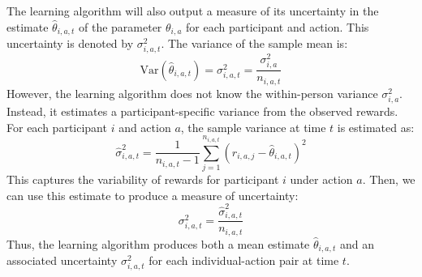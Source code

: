 \documentclass[letterpaper, 9pt]{extarticle}
\newcommand{\sam}[1]{
  {\color{blue} [SAM: {#1}]}
 }
\newcommand{\nys}[1]{%
  {\color{nyscolor} [\textbf{NYS}: {#1}]}%
}
\newcommand{\btk}[1]{%
  {\color{red} [\textbf{BTK}: {#1}]}%
}
\begin{document}
The learning algorithm will also output a measure of its uncertainty in the estimate $\hat{\theta}_{i,a,t}$ of the parameter $\theta_{i,a}$ for each participant and action.  This uncertainty is denoted by $\sigma^2_{i,a,t}$. %
The variance of the sample mean is:
\[
    \text{Var}(\hat{\theta}_{i,a,t}) =\sigma_{i,a,t}^2 = \frac{\sigma_{i,a}^2}{n_{i,a,t}}
\]
However, the learning algorithm does not know the within-person variance $\sigma_{i, a}^2$. Instead, it estimates a participant-specific variance from the observed rewards. For each participant $i$ and action $a$, the sample variance at time $t$ is estimated as: 
\[
\hat{\sigma}_{i,a,t}^2 = \frac{1}{n_{i,a,t}-1} \sum_{j=1}^{n_{i,a,t}} (r_{i,a,j} - \hat{\theta}_{i,a,t})^2
\]
This captures the variability of rewards for participant $i$ under action $a$. Then, we can use this estimate to produce a measure of uncertainty:
\[\sigma_{i,a,t}^2 = \frac{\hat{\sigma}_{i,a,t}^2}{n_{i,a,t}} \]
Thus, the learning algorithm produces both a mean estimate $\hat{\theta}_{i,a,t}$ and an associated uncertainty $\sigma_{i,a,t}^2$ for each individual-action pair at time $t$. 
\end{document}

